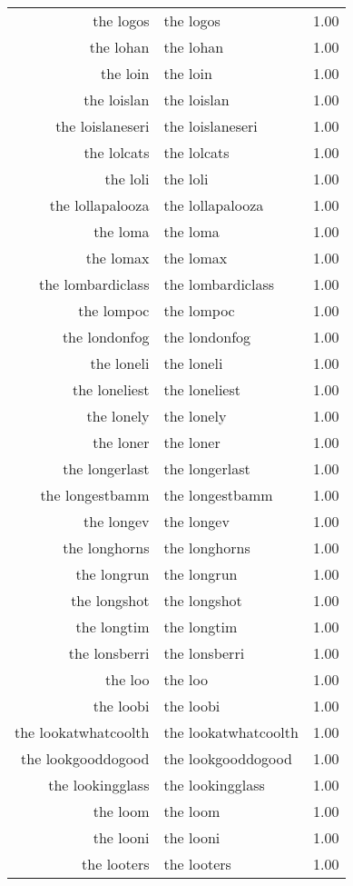\begin{table}[ht]
\begin{tabular}{rlr}
  the logos & the logos & 1.00 \\ 
  the lohan & the lohan & 1.00 \\ 
  the loin & the loin & 1.00 \\ 
  the loislan & the loislan & 1.00 \\ 
  the loislaneseri & the loislaneseri & 1.00 \\ 
  the lolcats & the lolcats & 1.00 \\ 
  the loli & the loli & 1.00 \\ 
  the lollapalooza & the lollapalooza & 1.00 \\ 
  the loma & the loma & 1.00 \\ 
  the lomax & the lomax & 1.00 \\ 
  the lombardiclass & the lombardiclass & 1.00 \\ 
  the lompoc & the lompoc & 1.00 \\ 
  the londonfog & the londonfog & 1.00 \\ 
  the loneli & the loneli & 1.00 \\ 
  the loneliest & the loneliest & 1.00 \\ 
  the lonely & the lonely & 1.00 \\ 
  the loner & the loner & 1.00 \\ 
  the longerlast & the longerlast & 1.00 \\ 
  the longestbamm & the longestbamm & 1.00 \\ 
  the longev & the longev & 1.00 \\ 
  the longhorns & the longhorns & 1.00 \\ 
  the longrun & the longrun & 1.00 \\ 
  the longshot & the longshot & 1.00 \\ 
  the longtim & the longtim & 1.00 \\ 
  the lonsberri & the lonsberri & 1.00 \\ 
  the loo & the loo & 1.00 \\ 
  the loobi & the loobi & 1.00 \\ 
  the lookatwhatcoolth & the lookatwhatcoolth & 1.00 \\ 
  the lookgooddogood & the lookgooddogood & 1.00 \\ 
  the lookingglass & the lookingglass & 1.00 \\ 
  the loom & the loom & 1.00 \\ 
  the looni & the looni & 1.00 \\ 
  the looters & the looters & 1.00 \\ 

\end{tabular}
\end{table}
